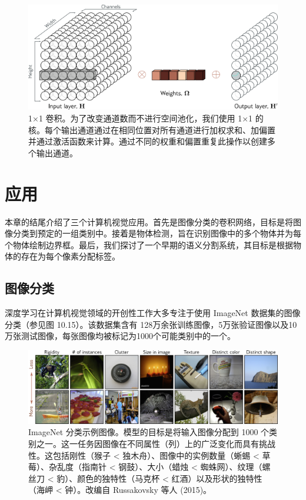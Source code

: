 \begin{figure}[ht!]
	\centering
	\includegraphics[width=0.7\linewidth]{png/chapter10/Conv1DChannels.png}
	\caption{1×1 卷积。为了改变通道数而不进行空间池化，我们使用 1×1 的核。每个输出通道通过在相同位置对所有通道进行加权求和、加偏置并通过激活函数来计算。通过不同的权重和偏置重复此操作以创建多个输出通道。}
\end{figure}

\section{应用}
本章的结尾介绍了三个计算机视觉应用。首先是图像分类的卷积网络，目标是将图像分类到预定的一组类别中。接着是物体检测，旨在识别图像中的多个物体并为每个物体绘制边界框。最后，我们探讨了一个早期的语义分割系统，其目标是根据物体的存在为每个像素分配标签。

\subsection{图像分类}
深度学习在计算机视觉领域的开创性工作大多专注于使用 ImageNet 数据集的图像分类（参见图 10.15）。该数据集含有 128万余张训练图像，5万张验证图像以及10万张测试图像，每张图像均被标记为1000个可能类别中的一个。



\begin{figure}[ht!]
	\centering
	\includegraphics[width=0.7\linewidth]{png/chapter10/ConvImageNet.png}
	\caption{ImageNet 分类示例图像。模型的目标是将输入图像分配到 1000 个类别之一。这一任务因图像在不同属性（列）上的广泛变化而具有挑战性。这包括刚性（猴子 < 独木舟）、图像中的实例数量（蜥蜴 < 草莓）、杂乱度（指南针 < 钢鼓）、大小（蜡烛 < 蜘蛛网）、纹理（螺丝刀 < 豹）、颜色的独特性（马克杯 < 红酒）以及形状的独特性（海岬 < 钟）。改编自 Russakovsky 等人 (2015)。}
\end{figure}


